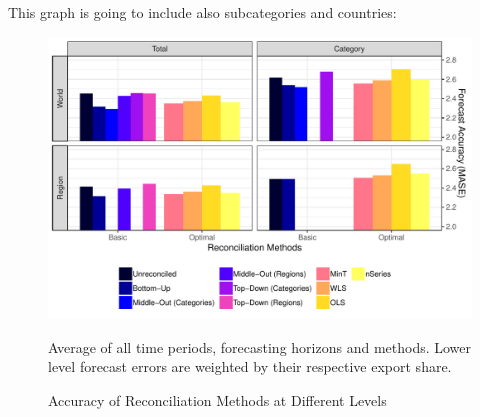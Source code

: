\documentclass[a4paper,fleqn,11pt]{article}
\begin{document}
This graph is going to include also subcategories and countries:
\begin{figure}[H]
	\includegraphics[width=\textwidth]{fig/fig_eval_levels}
	\caption{Accuracy of Reconciliation Methods at Different Levels}
	\footnotesize{Average of all time periods, forecasting horizons and methods. Lower level forecast errors are weighted by their respective export share.}
\end{figure}
\end{document}
